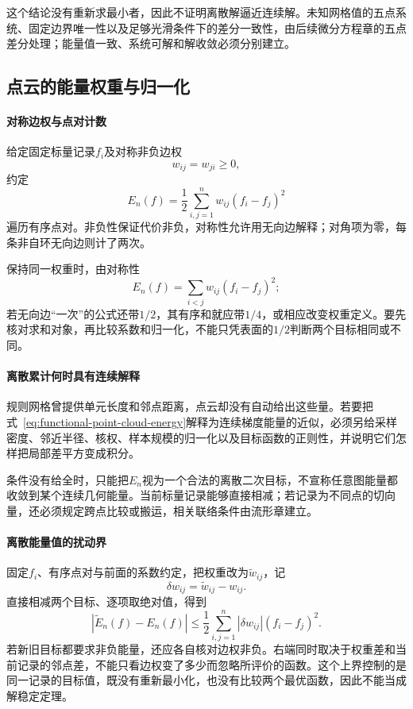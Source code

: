 这个结论没有重新求最小者，因此不证明离散解逼近连续解。未知网格值的五点系统、固定边界唯一性以及足够光滑条件下的差分一致性，由后续微分方程章的五点差分处理；能量值一致、系统可解和解收敛必须分别建立。

\subsection{点云的能量权重与归一化}
\label{subsubsec:point-cloud-energy}

\paragraph{对称边权与点对计数}

给定固定标量记录$f_i$及对称非负边权
\[
  w_{ij}=w_{ji}\ge0,
\]
约定
\begin{equation}
  E_n(f)=\frac12\sum_{i,j=1}^nw_{ij}(f_i-f_j)^2
  \label{eq:functional-point-cloud-energy}
\end{equation}
遍历有序点对。非负性保证代价非负，对称性允许用无向边解释；对角项为零，每条非自环无向边则计了两次。

保持同一权重时，由对称性
\[
  E_n(f)=\sum_{i<j}w_{ij}(f_i-f_j)^2;
\]
若无向边“一次”的公式还带$1/2$，其有序和就应带$1/4$，或相应改变权重定义。要先核对求和对象，再比较系数和归一化，不能只凭表面的$1/2$判断两个目标相同或不同。

\paragraph{离散累计何时具有连续解释}

规则网格曾提供单元长度和邻点距离，点云却没有自动给出这些量。若要把式~\eqref{eq:functional-point-cloud-energy}解释为连续梯度能量的近似，必须另给采样密度、邻近半径、核权、样本规模的归一化以及目标函数的正则性，并说明它们怎样把局部差平方变成积分。

条件没有给全时，只能把$E_n$视为一个合法的离散二次目标，不宣称任意图能量都收敛到某个连续几何能量。当前标量记录能够直接相减；若记录为不同点的切向量，还必须规定跨点比较或搬运，相关联络条件由流形章建立。

\paragraph{离散能量值的扰动界}

固定$f_i$、有序点对与前面的系数约定，把权重改为$\widetilde w_{ij}$，记
\[
  \delta w_{ij}=\widetilde w_{ij}-w_{ij}.
\]
直接相减两个目标、逐项取绝对值，得到
\begin{equation}
  |\widetilde E_n(f)-E_n(f)|
  \le\frac12\sum_{i,j=1}^n|\delta w_{ij}|(f_i-f_j)^2.
  \label{eq:functional-energy-weight-perturbation}
\end{equation}
若新旧目标都要求非负能量，还应各自核对边权非负。右端同时取决于权重差和当前记录的邻点差，不能只看边权变了多少而忽略所评价的函数。这个上界控制的是同一记录的目标值，既没有重新最小化，也没有比较两个最优函数，因此不能当成解稳定定理。

